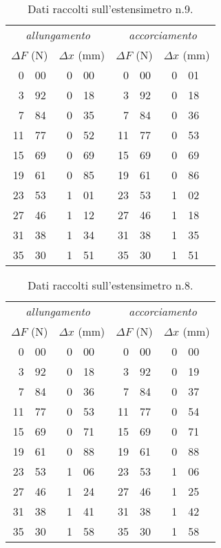 \begin{table}[hp]\caption{Dati raccolti sull'estensimetro n.9.}\label{tab9}
\centering \small
\begin{tabular}{*4{r@{.}l}}
\multicolumn{4}{c}{\emph{allungamento}} & \multicolumn{4}{c}{\emph{accorciamento}}\\
\multicolumn{2}{c}{$\Delta F$ (\unit{N})}
&\multicolumn{2}{c}{$\Delta x$ (\unit{mm})}
&\multicolumn{2}{c}{$\Delta F$ (\unit{N})}
&\multicolumn{2}{c}{$\Delta x$ (\unit{mm})}\\\hline
0&00 &0&00 &0&00 &0&01\\
3&92 &0&18 &3&92 &0&18\\
7&84 &0&35 &7&84 &0&36\\
11&77 &0&52 &11&77 &0&53\\
15&69 &0&69 &15&69 &0&69\\
19&61 &0&85 &19&61 &0&86\\
23&53 &1&01 &23&53 &1&02\\
27&46 &1&12 &27&46 &1&18\\
31&38 &1&34 &31&38 &1&35\\
35&30 &1&51 &35&30 &1&51
\end{tabular}
\end{table}
\begin{table}[hp]\caption{Dati raccolti sull'estensimetro n.8.}\label{tab8}
\centering \small
\begin{tabular}{*4{r@{.}l}}
\multicolumn{4}{c}{\emph{allungamento}} & \multicolumn{4}{c}{\emph{accorciamento}}\\
\multicolumn{2}{c}{$\Delta F$ (\unit{N})}
&\multicolumn{2}{c}{$\Delta x$ (\unit{mm})}
&\multicolumn{2}{c}{$\Delta F$ (\unit{N})}
&\multicolumn{2}{c}{$\Delta x$ (\unit{mm})}\\\hline
0&00 &0&00 &0&00 &0&00\\
3&92 &0&18 &3&92 &0&19\\
7&84 &0&36 &7&84 &0&37\\
11&77 &0&53 &11&77 &0&54\\
15&69 &0&71 &15&69 &0&71\\
19&61 &0&88 &19&61 &0&88\\
23&53 &1&06 &23&53 &1&06\\
27&46 &1&24 &27&46 &1&25\\
31&38 &1&41 &31&38 &1&42\\
35&30 &1&58 &35&30 &1&58\\
\end{tabular}
\end{table}

